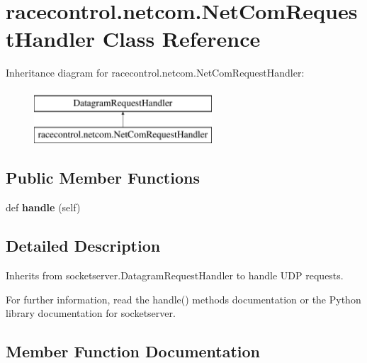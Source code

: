 \section{racecontrol.\+netcom.\+Net\+Com\+Request\+Handler Class Reference}
\label{classracecontrol_1_1netcom_1_1NetComRequestHandler}
Inheritance diagram for racecontrol.\+netcom.\+Net\+Com\+Request\+Handler\+:\begin{figure}[H]
\begin{center}
\leavevmode
\includegraphics[height=2.000000cm]{classracecontrol_1_1netcom_1_1NetComRequestHandler}
\end{center}
\end{figure}
\subsection*{Public Member Functions}
\begin{DoxyCompactItemize}
\item 
def {\bf handle} (self)
\end{DoxyCompactItemize}


\subsection{Detailed Description}
\begin{DoxyVerb}Inherits from socketserver.DatagramRequestHandler to handle UDP
requests.

For further information, read the handle() methods documentation or the
Python library documentation for socketserver.
\end{DoxyVerb}
 

\subsection{Member Function Documentation}

